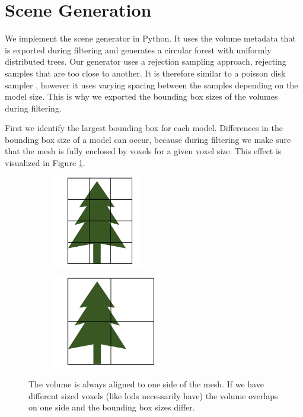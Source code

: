 \section{Scene Generation}
\label{sec:scene_generation}
We implement the scene generator in Python.
It uses the volume metadata that is exported during filtering and generates a circular forest with uniformly distributed trees.
Our generator uses a rejection sampling approach, rejecting samples that are too close to another.
It is therefore similar to a poisson disk sampler \cite{poisson_sampling}, however it uses varying spacing between the samples depending on the model size.
This is why we exported the bounding box sizes of the volumes during filtering.

First we identify the largest bounding box for each model.
Differences in the bounding box size of a model can occur, because during filtering we make sure that the mesh is fully enclosed by voxels for a given voxel size.
This effect is visualized in Figure \ref{fig:bounding_sizes}.
\begin{figure}[ht]
    \centering
    \begin{subfigure}[b]{0.45\linewidth}
        \centering
        \includegraphics[height=4cm]{img/bounding_size_1.png}
    \end{subfigure}
    \begin{subfigure}[b]{0.45\linewidth}
        \centering
        \includegraphics[height=4cm]{img/bounding_size_2.png}
    \end{subfigure}
	\caption[Bounding boxes resulting from different sized voxels]{The volume is always aligned to one side of the mesh. If we have different sized voxels (like \acsp{lod} necessarily have) the volume overlaps on one side and the bounding box sizes differ.}
	\label{fig:bounding_sizes}
\end{figure}
